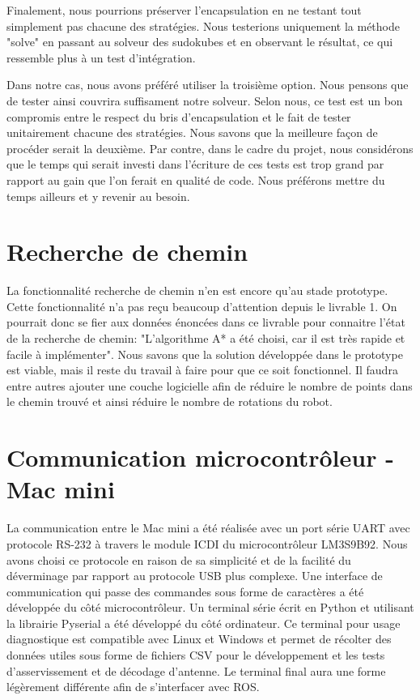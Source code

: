 Finalement, nous pourrions préserver l'encapsulation en ne testant tout simplement pas chacune des stratégies. Nous testerions uniquement la méthode "solve" en passant au solveur des sudokubes et en observant le résultat, ce qui ressemble plus à un test d'intégration.

Dans notre cas, nous avons préféré utiliser la troisième option. Nous pensons que de tester ainsi couvrira suffisament notre solveur. Selon nous, ce test est un bon compromis entre le respect du bris d'encapsulation et le fait de tester unitairement chacune des stratégies. Nous savons que la meilleure façon de procéder serait la deuxième. Par contre, dans le cadre du projet, nous considérons que le temps qui serait investi dans l'écriture de ces tests est trop grand par rapport au gain que l'on ferait en qualité de code. Nous préférons mettre du temps ailleurs et y revenir au besoin.

\section{Recherche de chemin}
La fonctionnalité recherche de chemin n’en est encore qu’au stade prototype. Cette fonctionnalité n'a pas reçu beaucoup d'attention depuis le livrable 1. On pourrait donc se fier aux données énoncées dans ce livrable pour connaitre l'état de la recherche de chemin: "L'algorithme A* a été choisi, car il est très rapide et facile à implémenter". Nous savons que la solution développée dans le prototype est viable, mais il reste du travail à faire pour que ce soit fonctionnel. Il faudra entre autres ajouter une couche logicielle afin de réduire le nombre de points dans le chemin trouvé et ainsi réduire le nombre de rotations du robot.

\section{Communication microcontrôleur - Mac mini}

La communication entre le Mac mini a été réalisée avec un port série UART avec protocole RS-232 à travers le module ICDI du microcontrôleur LM3S9B92. Nous avons choisi ce protocole en raison de sa simplicité et de la facilité du déverminage par rapport au protocole USB plus complexe. Une interface de communication qui passe des commandes sous forme de caractères a été développée du côté microcontrôleur. Un terminal série écrit en Python et utilisant la librairie Pyserial a été développé du côté ordinateur. Ce terminal pour usage diagnostique est compatible avec Linux et Windows et permet de récolter des données utiles sous forme de fichiers CSV pour le développement et les tests d'asservissement et de décodage d'antenne. Le terminal final aura une forme légèrement différente afin de s'interfacer avec ROS.

